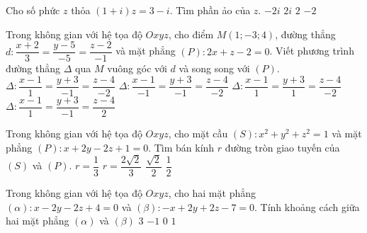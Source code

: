 \begin{ex}%
	Cho số phức $z$ thỏa $(1+i)z=3-i$. Tìm phần ảo của $z$.
	\choice
	{$-2i$}
	{$ 2i$}
	{$ 2$}
	{\True $ -2$}
\end{ex}

\begin{ex}%
	Trong không gian với hệ tọa độ $Oxyz$, cho điểm $M(1;-3;4)$, đường thẳng $d \colon \dfrac{x+2}{3}=\dfrac{y-5}{-5}=\dfrac{z-2}{-1}$ và mặt phẳng $(P) \colon 2x+z-2=0$. Viết phương trình đường thẳng $\Delta$ qua $M$ vuông góc với $d$ và song song với $(P)$.
	\choice
	{$\Delta \colon \dfrac{x-1}{1}=\dfrac{y+3}{-1}=\dfrac{z-4}{-2} $}
	{$\Delta \colon \dfrac{x-1}{-1}=\dfrac{y+3}{-1}=\dfrac{z-4}{-2} $}
	{\True $\Delta \colon \dfrac{x-1}{1}=\dfrac{y+3}{1}=\dfrac{z-4}{-2} $}
	{ $\Delta \colon \dfrac{x-1}{1}=\dfrac{y+3}{-1}=\dfrac{z-4}{2} $}
\end{ex}

\begin{ex}%
	Trong không gian với hệ tọa độ $Oxyz$, cho mặt cầu $(S) \colon x^2+y^2+z^2=1$ và mặt phẳng $(P) \colon x+2y-2z+1=0$. Tìm bán kính $r$ đường tròn giao tuyến của $(S)$ và $(P)$.
	\choice
	{$r=\dfrac{1}{3} $}
	{\True $r=\dfrac{2\sqrt{2}}{3} $}
	{$\dfrac{\sqrt{2}}{2} $}
	{ $\dfrac{1}{2} $}
\end{ex}
\begin{ex}%
	Trong không gian với hệ tọa độ $Oxyz$, cho hai mặt phẳng $(\alpha) \colon x-2y-2z+4=0$ và $(\beta) \colon -x+2y+2z-7=0$. Tính khoảng cách giữa hai mặt phẳng $(\alpha)$ và $(\beta)$
	\choice
	{$ 3$}
	{$ -1$}
	{$ 0$}
	{\True $ 1$}
\end{ex}

